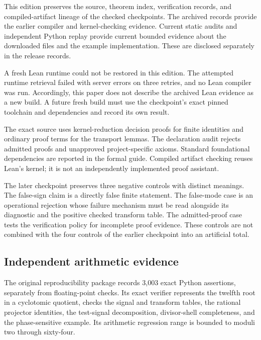 This edition preserves the source, theorem index, verification records,
and compiled-artifact lineage of the checked checkpoints. The archived
records provide the earlier compiler and kernel-checking evidence.
Current static audits and independent Python replay provide current
bounded evidence about the downloaded files and the example
implementation. These are disclosed separately in the release records.

A fresh Lean runtime could not be restored in this edition. The
attempted runtime retrieval failed with server errors on three retries,
and no Lean compiler was run. Accordingly, this paper does not describe
the archived Lean evidence as a new build. A future fresh build must use
the checkpoint's exact pinned toolchain and dependencies and record its
own result.

The exact source uses kernel-reduction decision proofs for finite
identities and ordinary proof terms for the transport lemmas. The
declaration audit rejects admitted proofs and unapproved
project-specific axioms. Standard foundational dependencies are reported
in the formal guide. Compiled artifact checking reuses Lean's kernel; it
is not an independently implemented proof assistant.

The later checkpoint preserves three negative controls with distinct
meanings. The false-sign claim is a directly false finite statement. The
false-mode case is an operational rejection whose failure mechanism must
be read alongside its diagnostic and the positive checked transform
table. The admitted-proof case tests the verification policy for
incomplete proof evidence. These controls are not combined with the four
controls of the earlier checkpoint into an artificial total.

\hypertarget{independent-arithmetic-evidence}{%
\subsection{Independent arithmetic
evidence}\label{independent-arithmetic-evidence}}

The original reproducibility package records 3,003 exact Python
assertions, separately from floating-point checks. Its exact verifier
represents the twelfth root in a cyclotomic quotient, checks the signal
and transform tables, the rational projector identities, the test-signal
decomposition, divisor-shell completeness, and the phase-sensitive
example. Its arithmetic regression range is bounded to moduli two
through sixty-four.

